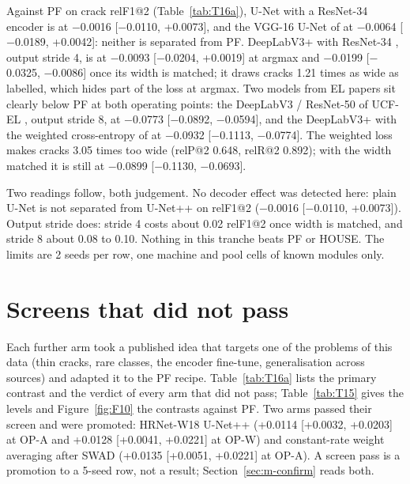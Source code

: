 Against PF on crack relF1@2 (Table~\ref{tab:T16a}), U-Net with a ResNet-34 encoder \citep{ronneberger2015unet} is at
$-$0.0016 [$-$0.0110, +0.0073], and the VGG-16 U-Net of \citet{hanifi2025multiclass} at $-$0.0064 [$-$0.0189, +0.0042]: neither
is separated from PF. DeepLabV3+ with ResNet-34 \citep{chen2018deeplabv3plus}, output stride 4, is at $-$0.0093
[$-$0.0204, +0.0019] at argmax and $-$0.0199 [$-$0.0325, $-$0.0086] once its width is matched; it draws cracks 1.21 times as wide
as labelled, which hides part of the loss at argmax. Two models from EL papers sit clearly below PF at both operating points: the
DeepLabV3 / ResNet-50 of UCF-EL \citep{chen2017deeplabv3,fioresi2022ucfel}, output stride 8, at $-$0.0773 [$-$0.0892, $-$0.0594],
and the DeepLabV3+ with the weighted cross-entropy of \citet{pratt2023benchmark} at $-$0.0932 [$-$0.1113, $-$0.0774]. The weighted loss makes
cracks 3.05 times too wide (relP@2 0.648, relR@2 0.892); with the width matched it is still at $-$0.0899 [$-$0.1130, $-$0.0693].

Two readings follow, both judgement. No decoder effect was detected here: plain U-Net is not separated from U-Net++ on relF1@2 ($-$0.0016 [$-$0.0110, +0.0073]). Output stride
does: stride 4 costs about 0.02 relF1@2 once width is matched, and stride 8 about 0.08 to 0.10. Nothing in this tranche beats PF
or HOUSE. The limits are 2 seeds per row, one machine and pool cells of known modules only.

\section{Screens that did not pass}\label{sec:m-screens}

Each further arm took a published idea that targets one of the problems of this data (thin cracks, rare classes, the encoder
fine-tune, generalisation across sources) and adapted it to the PF recipe. Table~\ref{tab:T16a} lists the primary contrast and
the verdict of every arm that did not pass; Table~\ref{tab:T15} gives the levels and Figure~\ref{fig:F10} the contrasts against PF. Two arms passed their screen and were
promoted: HRNet-W18 U-Net++ \citep{wang2021hrnet} (+0.0114 [+0.0032, +0.0203] at OP-A and +0.0128 [+0.0041, +0.0221] at OP-W)
and constant-rate weight averaging after SWAD \citep{cha2021swad} (+0.0135 [+0.0051, +0.0221] at OP-A). A screen pass is a
promotion to a 5-seed row, not a result; Section~\ref{sec:m-confirm} reads both.



